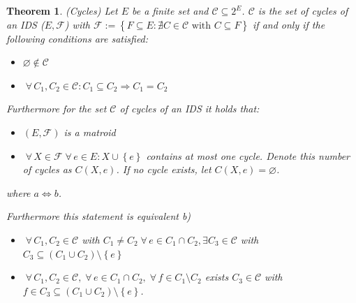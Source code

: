 \documentclass{article}
\newtheorem{theorem}{Theorem}
\newcommand{\set}[1]{\left\{#1\right\}}
\newcommand{\fall}{\;\forall\,}
\begin{document}
\begin{theorem}
  \label{satz-8.8}
  (Cycles)
  Let $E$ be a finite set and $\mathcal{C} \subseteq 2^E$. $\mathcal{C}$ is the set of cycles of an IDS ($E, \mathcal{F}$) with $\mathcal{F} := \set{F \subseteq E: \nexists C \in \mathcal{C} \text{ with } C \subseteq F}$ if and only if the following conditions are satisfied:

  \begin{itemize}
    \item[(C1)] $\diameter \notin \mathcal{C}$
    \item[(C2)] $\fall C_1, C_2 \in \mathcal{C}: C_1 \subseteq C_2 \Rightarrow C_1 = C_2$
  \end{itemize}

  Furthermore for the set $\mathcal{C}$ of cycles of an IDS it holds that:
  \begin{itemize}
    \item[a)] $(E, \mathcal{F})$ is a matroid
    \item[b)] $\fall X \in \mathcal{F} \fall e \in E: X \cup \set{e}$ contains at most one cycle. Denote this number of cycles as $C(X, e)$. If no cycle exists, let $C(X, e) = \diameter$.
  \end{itemize}
  where $a \Leftrightarrow b$.

  Furthermore this statement is equivalent b)
  \begin{itemize}
    \item[(C3)] $\fall C_1, C_2 \in \mathcal{C}$ with $C_1 \neq C_2 \fall e \in C_1 \cap C_2, \exists C_3 \in \mathcal{C}$ with $C_3 \subseteq (C_1 \cup C_2) \setminus \set{e}$
    \item[(C4)] $\fall C_1, C_2 \in \mathcal{C}, \fall e \in C_1 \cap C_2, \fall f \in C_1 \setminus C_2$ exists $C_3 \in \mathcal{C}$ with $f \in C_3 \subseteq (C_1 \cup C_2) \setminus \set{e}$.
  \end{itemize}
\end{theorem}
\end{document}
